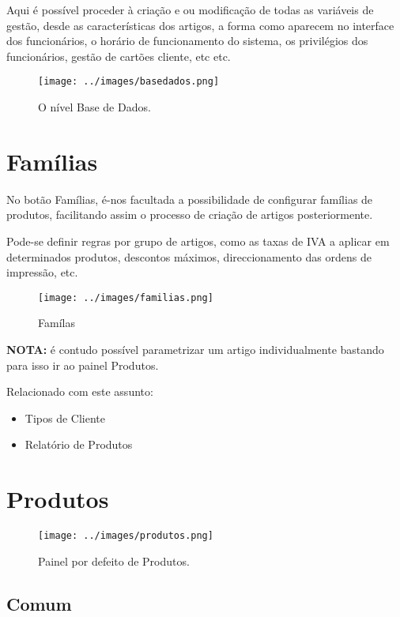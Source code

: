 \documentclass[a4paper,11pt,openany]{memoir}
\begin{document}
Aqui é possível proceder à criação e ou modificação de todas as variáveis de gestão, desde as 
características dos artigos, a forma como aparecem no interface dos funcionários, o horário
de funcionamento do sistema, os privilégios dos funcionários, gestão de cartões cliente, etc etc.
\nopagebreak
\begin{figure}
\texttt{[image: ../images/basedados.png]}
\caption[Submanifold]{O nível Base de Dados.}
\end{figure}

\newpage
\section{Famílias}

No botão Famílias, é-nos facultada a possibilidade de configurar famílias de produtos,
facilitando assim o processo de criação de artigos posteriormente.


Pode-se definir regras por grupo de artigos, como as taxas de IVA a aplicar 
em determinados produtos, descontos máximos, direccionamento das ordens de impressão, etc.


\begin{figure}
\texttt{[image: ../images/familias.png]}
\caption[Submanifold]{Famílas}
\end{figure}

\textbf{NOTA:} é contudo possível parametrizar um artigo individualmente bastando para isso ir ao painel
Produtos.

Relacionado com este assunto:
\begin{itemize}
\item Tipos de Cliente
\item Relatório de Produtos
\end{itemize}

\section{Produtos}

\begin{figure}
\texttt{[image: ../images/produtos.png]}
\caption[Submanifold]{Painel por defeito de Produtos.}
\end{figure}

\subsection{Comum}
\end{document}
